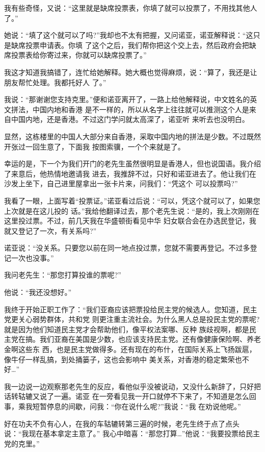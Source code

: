 ﻿\documentclass[11pt]{article}
\begin{document}
我有些奇怪，又说：``这里就是缺席投票表，你填了就可以投票了，不用找其他人了。''

她说：``填了这个就可以了吗?''我却也不太有把握，又问诺亚，诺亚解释说：``这只是缺席投票申请表。你填
了这个之后，我们帮你把这个交上去，然后政府会把缺席投票表给你寄过来，你就可以缺席投票了。''

我这才知道我搞错了，连忙给她解释。她大概也觉得麻烦，说：``算了，我还是让朋友帮忙处理。我都托好人
了。''

我说：``那谢谢您支持克里。''便和诺亚离开了，一路上给他解释说，中文姓名的英文拼法，中国内地和香港
是不一样的，所以从名字上往往就可以推测这个人是来自中国内地，还是香港。不过这门学问就太高深了，诺亚听
来听去也没明白。

显然，这栋楼里的中国人大部分来自香港，采取中国内地的拼法是少数。不过既然开张过一回生意了，下面我
按图索骥，一个个来就是了。

幸运的是，下一个为我们开门的老先生虽然很明显是香港人，但也说国语。我介绍了来意后，他热情地邀请我
进去，我推辞不过，只好和诺亚进去了。他让我们在沙发上坐下，自己进里屋拿出一张卡片来，问我们：``凭这个
可以投票吗?''

我看了一眼，上面写着``投票证。''诺亚看过后说：``可以，凭这个就可以了，如果您上次就是在这儿投的
话。''我给他翻译过去，那个老先生说：``是的，我上次刚刚在这里投过票。不过，前几天我在华盛顿街看见中华
妇女联合会在办选民登记，我就又登记了一次，有关系吗?''

诺亚说：``没关系。只要您以前在同一地点投过票，您就不需要再登记。不过多登记一次也没事。''

我问老先生：``那您打算投谁的票呢?''

他说：``我还没想好。''

我终于开始正职工作了：``我们亚裔应该把票投给民主党的候选人。您知道，民主党更关心弱势群体，共和党
则更注重主流社会。为什么黑人总是投民主党的票呢?就是因为他们知道民主党才会帮助他们，像平权法案哪、反种
族歧视啊，都是民主党在搞。我们亚裔在美国是少数，也应该支持民主党。还有像健康保险啊、养老金啊这些东
西，也是民主党做得多。还有现在的布什，在国际关系上飞扬跋扈，像牛仔一样乱搞，到处捅篓子，这也会影响中
美关系，对香港的稳定繁荣也不好\ldots ''

我一边说一边观察那老先生的反应，看他似乎没被说动，又没什么新辞了，只好把话转轱辘又说了一遍。诺亚
在一旁看见我一开口就停不下来了，不知道是怎么回事，乘我短暂停息的间歇，问我：``你在说什么呢?''我说：``我
在劝说他呢。''

好在功夫不负有心人，在我的车轱辘转第三遍的时候，老先生终于点了点头说：``我现在基本拿定主意了。''
我心中暗喜：``那您打算\ldots ''他说：``我要投票给民主党的克里。''
\end{document}

